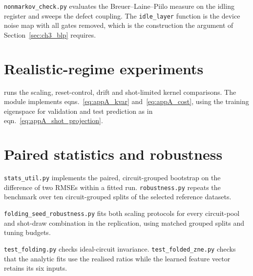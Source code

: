 \texttt{nonmarkov\_check.py} evaluates the Breuer--Laine--Piilo measure on the idling
register and sweeps the defect coupling. The \texttt{idle\_layer} function is the
device noise map with all gates removed, which is the construction the argument of
Section~\ref{sec:ch3_blp} requires.



\section{Realistic-regime experiments}

 runs the scaling, reset-control, drift and
shot-limited kernel comparisons. The  module implements eqns.~\eqref{eq:appA_kvar}
and~\eqref{eq:appA_cost}, using the training eigenspace for validation and test
prediction as in eqn.~\eqref{eq:appA_shot_projection}.





\section{Paired statistics and robustness}

\texttt{stats\_util.py} implements the paired, circuit-grouped bootstrap on the
difference of two RMSEs within a fitted run.
\texttt{robustness.py} repeats the benchmark over ten circuit-grouped
splits of the selected reference datasets.

\texttt{folding\_seed\_robustness.py} fits both scaling protocols for every
circuit-pool and shot-draw combination in the replication, using
matched grouped splits and tuning budgets.


\texttt{test\_folding.py} checks ideal-circuit invariance.
\texttt{test\_folded\_zne.py} checks that the analytic fits use the realised
ratios while the learned feature vector retains its six inputs.



